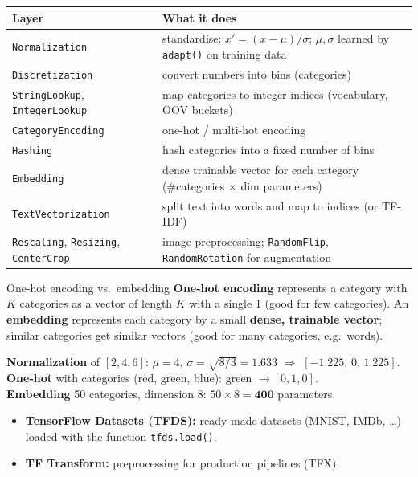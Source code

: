 \begin{center}
\small
\begin{tabular}{@{}p{4.6cm}p{11.7cm}@{}}
\toprule
\textbf{Layer} & \textbf{What it does}\\
\midrule
\texttt{Normalization} & standardise: $x'=(x-\mu)/\sigma$; $\mu,\sigma$ learned by \texttt{adapt()} on training data\\
\texttt{Discretization} & convert numbers into bins (categories)\\
\texttt{StringLookup}, \texttt{IntegerLookup} & map categories to integer indices (vocabulary, OOV buckets)\\
\texttt{CategoryEncoding} & one-hot / multi-hot encoding\\
\texttt{Hashing} & hash categories into a fixed number of bins\\
\texttt{Embedding} & dense trainable vector for each category (\#categories $\times$ dim parameters)\\
\texttt{TextVectorization} & split text into words and map to indices (or TF-IDF)\\
\texttt{Rescaling}, \texttt{Resizing}, \texttt{CenterCrop} & image preprocessing; \texttt{RandomFlip}, \texttt{RandomRotation} for augmentation\\
\bottomrule
\end{tabular}
\end{center}

\begin{dfn}{One-hot encoding vs.\ embedding}
\textbf{One-hot encoding} represents a category with $K$ categories as a vector of length $K$ with a single 1 (good for few categories). An \textbf{embedding} represents each category by a small \textbf{dense, trainable vector}; similar categories get similar vectors (good for many categories, e.g.\ words).
\end{dfn}
\begin{numer}[: preprocessing]
\textbf{Normalization} of $[2,4,6]$: $\mu=4$, $\sigma=\sqrt{8/3}=1.633$ $\Rightarrow$ $[-1.225,\,0,\,1.225]$.\\
\textbf{One-hot} with categories (red, green, blue): green $\to[0,1,0]$.\\
\textbf{Embedding} 50 categories, dimension 8: $50\times8=\mathbf{400}$ parameters.
\end{numer}
\begin{itemize}
  \item \textbf{TensorFlow Datasets (TFDS):} ready-made datasets (MNIST, IMDb, \dots) loaded with the function \texttt{tfds.load()}.
  \item \textbf{TF Transform:} preprocessing for production pipelines (TFX).
\end{itemize}

